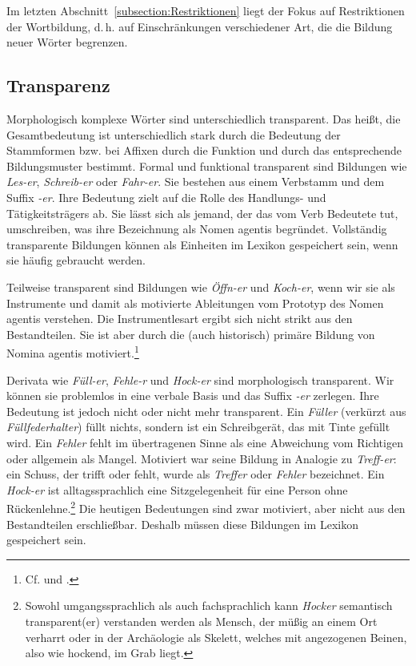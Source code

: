 Im letzten Abschnitt~\ref{subsection:Restriktionen} liegt der Fokus auf Restriktionen der Wortbildung, d.\,h. auf Einschränkungen verschiedener Art, die die Bildung neuer Wörter begrenzen. 


\subsection{Transparenz}\label{subsection:Transparenz}

Morphologisch komplexe Wörter sind unterschiedlich transparent. Das heißt, die Gesamtbedeutung ist unterschiedlich stark durch die Bedeutung der Stammformen bzw. bei Affixen durch die Funktion und durch das entsprechende Bildungsmuster bestimmt. Formal und funktional transparent sind Bildungen wie \textit{Les-er}, \textit{Schreib-er} oder \textit{Fahr-er}. Sie bestehen aus einem Verbstamm und dem Suffix \textit{-er}. Ihre Bedeutung zielt auf die Rolle des Handlungs- und Tätigkeitsträgers ab. Sie lässt sich als jemand, der das vom Verb Bedeutete tut, umschreiben, was ihre Bezeichnung als Nomen agentis begründet. Vollständig transparente Bildungen können als Einheiten im Lexikon gespeichert sein, wenn sie häufig gebraucht werden.

Teilweise transparent sind Bildungen wie \textit{Öffn-er} und \textit{Koch-er}, wenn wir sie als Instrumente und damit als motivierte Ableitungen vom Prototyp des Nomen agentis verstehen. Die Instrumentlesart ergibt sich nicht strikt aus den Bestandteilen. Sie ist aber durch die (auch historisch) primäre Bildung von Nomina agentis motiviert.\footnote{Cf. \citet[524--526]{Dressler1986} und \citet[506]{Booij1986}.}

Derivata wie \textit{Füll-er}, \textit{Fehle-r} und \textit{Hock-er} sind morphologisch transparent. Wir können sie problemlos in eine verbale Basis und das Suffix \textit{-er} zerlegen. Ihre Bedeutung ist jedoch nicht oder nicht mehr transparent. Ein \textit{Füller} (verkürzt aus \textit{Füllfederhalter}) füllt nichts, sondern ist ein Schreibgerät, das mit Tinte gefüllt wird. Ein \textit{Fehler} fehlt im übertragenen Sinne als eine Abweichung vom Richtigen oder allgemein als Mangel. Motiviert war seine Bildung in Analogie zu \textit{Treff-er}: ein Schuss, der trifft oder fehlt, wurde als \textit{Treffer} oder \textit{Fehler} bezeichnet. Ein \textit{Hock-er} ist alltagssprachlich eine Sitzgelegenheit für eine Person ohne Rückenlehne.\footnote{Sowohl umgangssprachlich als auch fachsprachlich kann \textit{Hocker} semantisch transparent(er) verstanden werden als Mensch, der müßig an einem Ort verharrt oder in der Archäologie als Skelett, welches mit angezogenen Beinen, also wie hockend, im Grab liegt.} Die heutigen Bedeutungen sind zwar motiviert, aber nicht aus den Bestandteilen erschließbar. Deshalb müssen diese Bildungen im Lexikon gespeichert sein.

